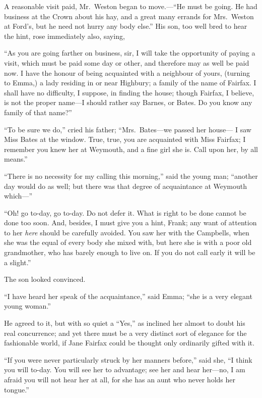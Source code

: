 A reasonable visit paid, Mr.\ Weston began to move.---``He must be going.
He had business at the Crown about his hay, and a great many errands
for Mrs.\ Weston at Ford's, but he need not hurry any body else.''
His son, too well bred to hear the hint, rose immediately also,
saying,

``As you are going farther on business, sir, I will take the
opportunity of paying a visit, which must be paid some day or other,
and therefore may as well be paid now.  I have the honour of being
acquainted with a neighbour of yours, (turning to Emma,) a lady
residing in or near Highbury; a family of the name of Fairfax.
I shall have no difficulty, I suppose, in finding the house;
though Fairfax, I believe, is not the proper name---I should rather
say Barnes, or Bates.  Do you know any family of that name?''

``To be sure we do,'' cried his father; ``Mrs.\ Bates---we passed her house---%
I saw Miss Bates at the window.  True, true, you are acquainted
with Miss Fairfax; I remember you knew her at Weymouth, and a fine
girl she is.  Call upon her, by all means.''

``There is no necessity for my calling this morning,'' said the
young man; ``another day would do as well; but there was that degree
of acquaintance at Weymouth which---''

``Oh! go to-day, go to-day. Do not defer it.  What is right to be done
cannot be done too soon.  And, besides, I must give you a hint, Frank;
any want of attention to her \emph{here} should be carefully avoided.
You saw her with the Campbells, when she was the equal of every body
she mixed with, but here she is with a poor old grandmother,
who has barely enough to live on.  If you do not call early it
will be a slight.''

The son looked convinced.

``I have heard her speak of the acquaintance,'' said Emma; ``she is
a very elegant young woman.''

He agreed to it, but with so quiet a ``Yes,'' as inclined her almost
to doubt his real concurrence; and yet there must be a very distinct
sort of elegance for the fashionable world, if Jane Fairfax could
be thought only ordinarily gifted with it.

``If you were never particularly struck by her manners before,''
said she, ``I think you will to-day. You will see her to advantage;
see her and hear her---no, I am afraid you will not hear her at all,
for she has an aunt who never holds her tongue.''

